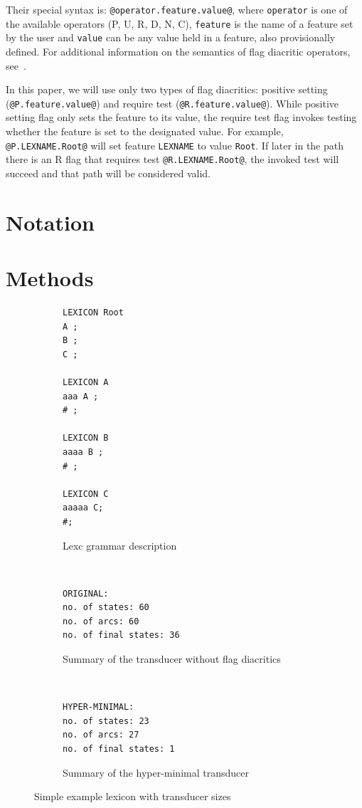 \documentclass[11pt]{article}
\begin{document}
Their special syntax is: \verb+@operator.feature.value@+, where
\texttt{operator} is one of the available operators (P, U, R, D, N, C), \texttt{feature} is the name of a feature set by the user and \texttt{value} can be any value held in a feature, also provisionally defined. For additional information on the semantics of flag diacritic operators, see~.


In this paper, we will use only two types of flag diacritics: positive
setting (\verb+@P.feature.value@+) and require test
(\verb+@R.feature.value@+). While positive setting flag only sets the
feature to its value, the require test flag invokes testing whether the
feature is set to the designated value. For example,
\verb+@P.LEXNAME.Root@+ will set feature \texttt{LEXNAME} to value
\texttt{Root}. If later in the path there is an R flag that requires test
\verb+@R.LEXNAME.Root@+, the invoked test will succeed and that path
will be considered valid.


\section{Notation}
\label{sec:notation}

\section{Methods}
\label{sec:methods}


\begin{figure}[htbp]
    \centering

\begin{subfigure}[t]{0.3\textwidth}
\begin{verbatim}
LEXICON Root
A ;
B ;
C ;

LEXICON A
aaa A ;
# ;

LEXICON B
aaaa B ;
# ;

LEXICON C
aaaaa C;
#;
\end{verbatim}
\caption{Lexc grammar description
\label{fig:lexc-a2}}
\end{subfigure}
 ~ %
\begin{subfigure}[t]{0.3\textwidth}
\begin{verbatim}
ORIGINAL:
no. of states: 60
no. of arcs: 60
no. of final states: 36
\end{verbatim}
\caption{Summary of the transducer without flag diacritics
\label{fig:sizes-orig}}
\end{subfigure}%
 ~ %
\begin{subfigure}[t]{0.3\textwidth}
\begin{verbatim}
HYPER-MINIMAL:
no. of states: 23
no. of arcs: 27
no. of final states: 1
\end{verbatim}
\caption{Summary of the hyper-minimal transducer
\label{fig:sizes-flags}}
 \end{subfigure}

 \caption{Simple example lexicon with transducer sizes}
 \label{fig:simple-ex}
\end{figure}
\end{document}
